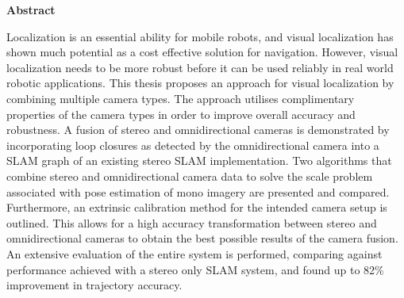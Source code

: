 \clearemptydoublepage
{}
{}

\vspace*{1cm}
\begin{center}
{\Large \bf Abstract}
\end{center}
\vspace{1cm}

Localization is an essential ability for mobile robots, and visual localization has shown much potential as a cost effective solution for navigation.  However, visual localization needs to be more robust before it can be used reliably in real world robotic applications.  This thesis proposes an approach for visual localization by combining multiple camera types.  The approach utilises complimentary properties of the camera types in order to improve overall accuracy and robustness. A fusion of stereo and omnidirectional cameras is demonstrated by incorporating loop closures as detected by the omnidirectional camera into a SLAM graph of an existing stereo SLAM implementation.  Two algorithms that combine stereo and omnidirectional camera data to solve the scale problem associated with pose estimation of mono imagery are presented and compared.  Furthermore, an extrinsic calibration method for the intended camera setup is outlined.  This allows for a high accuracy transformation between stereo and omnidirectional cameras to obtain the best possible results of the camera fusion. An extensive evaluation of the entire system is performed, comparing against performance achieved with a stereo only SLAM system, and found up to 82\% improvement in trajectory accuracy.

